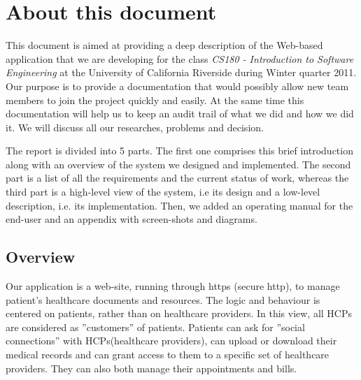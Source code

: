 \section{About this document}

This document is aimed at providing a deep description of the Web-based application that we are developing for the class \emph{CS180 - Introduction to Software Engineering} at the University of California Riverside during Winter quarter 2011. Our purpose is to provide a documentation that would possibly allow new team members to join the project quickly and easily. At the same time this documentation will help us to keep an audit trail of what we did and how we did it. We will discuss all our researches, problems and decision.

The report is divided into 5 parts. The first one comprises this brief introduction along with an overview of the system we designed and implemented. The second part is a list of all the requirements and the current status of work, whereas the third part is a high-level view of the system, i.e its design and a low-level description, i.e. its implementation. Then, we added an operating manual for the end-user and an appendix with screen-shots and diagrams.

\subsection{Overview}
Our application is a web-site, running through https (secure http), to manage patient's healthcare documents and resources. The logic and behaviour is centered on patients, rather than on healthcare providers. In this view, all HCPs are considered as ''customers'' of patients. Patients can ask for ''social connections'' with HCPs(healthcare providers), can upload or download their medical records and can grant access to them to a specific set of healthcare providers. They can also both manage their appointments and bills.

